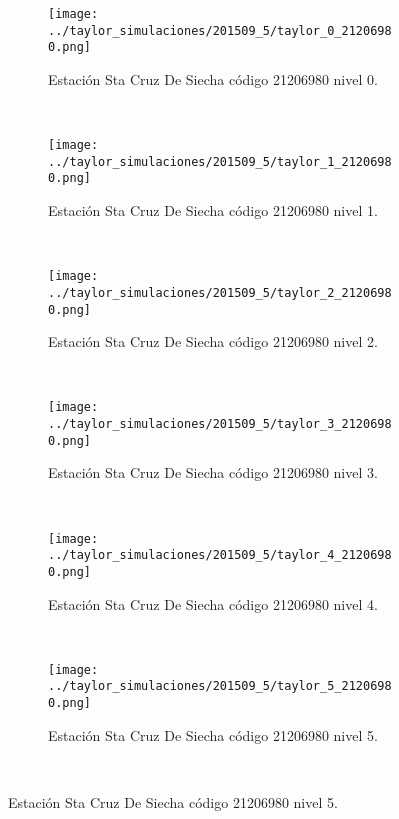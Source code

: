 \begin{figure}



\begin{subfigure}[normla]{0.4\textwidth}
\texttt{[image: ../taylor\_simulaciones/201509\_5/taylor\_0\_21206980.png]}
\caption{Estación Sta Cruz De Siecha  código 21206980 nivel 0.}
\end{subfigure}
~
\begin{subfigure}[normla]{0.4\textwidth}
\texttt{[image: ../taylor\_simulaciones/201509\_5/taylor\_1\_21206980.png]}
\caption{Estación Sta Cruz De Siecha  código 21206980 nivel 1.}
\end{subfigure}
~
\begin{subfigure}[normla]{0.4\textwidth}
\texttt{[image: ../taylor\_simulaciones/201509\_5/taylor\_2\_21206980.png]}
\caption{Estación Sta Cruz De Siecha  código 21206980 nivel 2.}
\end{subfigure}
~
\begin{subfigure}[normla]{0.4\textwidth}
\texttt{[image: ../taylor\_simulaciones/201509\_5/taylor\_3\_21206980.png]}
\caption{Estación Sta Cruz De Siecha  código 21206980 nivel 3.}
\end{subfigure}
~
\begin{subfigure}[normla]{0.4\textwidth}
\texttt{[image: ../taylor\_simulaciones/201509\_5/taylor\_4\_21206980.png]}
\caption{Estación Sta Cruz De Siecha  código 21206980 nivel 4.}
\end{subfigure}
~
\begin{subfigure}[normla]{0.4\textwidth}
\texttt{[image: ../taylor\_simulaciones/201509\_5/taylor\_5\_21206980.png]}
\caption{Estación Sta Cruz De Siecha  código 21206980 nivel 5.}
\end{subfigure}
~
\end{figure}
           
